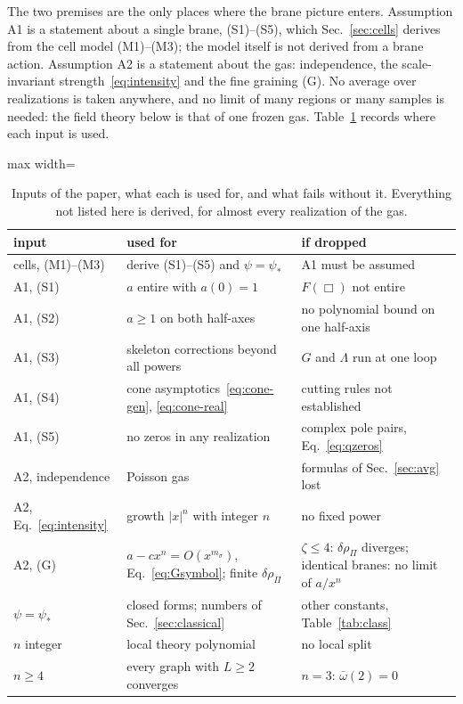 \documentclass[a4paper,11pt]{article}
\begin{document}
The two premises are the only places where the brane picture enters. Assumption A1 is a statement about a single brane, (S1)--(S5), which Sec.~\ref{sec:cells} derives from the cell model (M1)--(M3); the model itself is not derived from a brane action. Assumption A2 is a statement about the gas: independence, the scale-invariant strength~\eqref{eq:intensity} and the fine graining (G). No average over realizations is taken anywhere, and no limit of many regions or many samples is needed: the field theory below is that of one frozen gas. Table~\ref{tab:assumptions} records where each input is used.

\begin{table}[t]
\centering
\small\begin{adjustbox}{max width=\linewidth}\begin{tabular}{p{1.95cm}p{3.05cm}p{2.9cm}}
input & used for & if dropped\\
\hline
cells, (M1)--(M3) & derive (S1)--(S5) and $\psi=\psi_*$ & A1 must be assumed\\
A1, (S1) & $a$ entire with $a(0)=1$ & $F(\Box)$ not entire\\
A1, (S2) & $a\ge1$ on both half-axes & no polynomial bound on one half-axis\\
A1, (S3) & skeleton corrections beyond all powers & $G$ and $\Lambda$ run at one loop\\
A1, (S4) & cone asymptotics~\eqref{eq:cone-gen}, \eqref{eq:cone-real} & cutting rules not established\\
A1, (S5) & no zeros in any realization & complex pole pairs, Eq.~\eqref{eq:qzeros}\\
A2, independence & Poisson gas & formulas of Sec.~\ref{sec:avg} lost\\
A2, Eq.~\eqref{eq:intensity} & growth $|x|^n$ with integer $n$ & no fixed power\\
A2, (G) & $a-cx^n=O(x^{m_\sigma})$, Eq.~\eqref{eq:Gsymbol}; finite $\delta\rho_\Pi$ & $\zeta\le4$: $\delta\rho_\Pi$ diverges; identical branes: no limit of $a/x^n$\\
$\psi=\psi_*$ & closed forms; numbers of Sec.~\ref{sec:classical} & other constants, Table~\ref{tab:class}\\
$n$ integer & local theory polynomial & no local split\\
$n\ge4$ & every graph with $L\ge2$ converges & $n=3$: $\bar\omega(2)=0$\\
\hline\hline
\end{tabular}\end{adjustbox}
\caption{Inputs of the paper, what each is used for, and what fails without it. Everything not listed here is derived, for almost every realization of the gas.}
\label{tab:assumptions}
\end{table}
\end{document}
